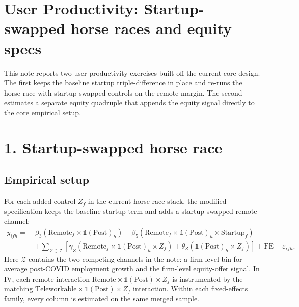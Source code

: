 \documentclass{article}
\begin{document}
\section*{User Productivity: Startup-swapped horse races and equity specs}

\noindent This note reports two user-productivity exercises built off the current core design. The first keeps the baseline startup triple-difference in place and re-runs the horse race with startup-swapped controls on the remote margin. The second estimates a separate equity quadruple that appends the equity signal directly to the core empirical setup.

\section*{1. Startup-swapped horse race}

\subsection*{Empirical setup}
\noindent For each added control $Z_f$ in the current horse-race stack, the modified specification keeps the baseline startup term and adds a startup-swapped remote channel:
\[
  \begin{aligned}
    y_{ifh} =\; & \beta_3 \left( \text{Remote}_f \times \mathds{1}(\text{Post})_h \right)
    + \beta_5 \left( \text{Remote}_f \times \mathds{1}(\text{Post})_h \times \text{Startup}_f \right) \\
    & + \sum_{Z \in \mathcal{Z}} \left[
        \gamma_Z \left( \text{Remote}_f \times \mathds{1}(\text{Post})_h \times Z_f \right)
        + \theta_Z \left( \mathds{1}(\text{Post})_h \times Z_f \right)
      \right]
    + \text{FE} + \varepsilon_{ifh} .
  \end{aligned}
\]
\noindent Here $\mathcal{Z}$ contains the two competing channels in the note: a firm-level bin for average post-COVID employment growth and the firm-level equity-offer signal. In IV, each remote interaction $\text{Remote}\times\mathds{1}(\text{Post})\times Z_f$ is instrumented by the matching $\text{Teleworkable}\times\mathds{1}(\text{Post})\times Z_f$ interaction. Within each fixed-effects family, every column is estimated on the same merged sample.
\end{document}
